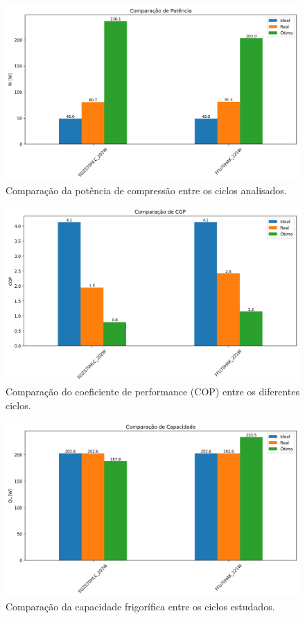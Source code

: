 \begin{figure}[ht]
    \centering
    \includegraphics[width=0.8\linewidth]{Imagens/Desenvolvimento/barras_W.png}
    \caption{Comparação da potência de compressão entre os ciclos analisados.}
    \label{fig:barras W}
\end{figure}

\begin{figure}[ht]
    \centering
    \includegraphics[width=0.8\linewidth]{Imagens/Desenvolvimento/barras_COP.png}
    \caption{Comparação do coeficiente de performance (COP) entre os diferentes ciclos.}
    \label{fig:barras COP}
\end{figure}

\begin{figure}[ht]
    \centering
    \includegraphics[width=0.8\linewidth]{Imagens/Desenvolvimento/barras_QL.png}
    \caption{Comparação da capacidade frigorífica entre os ciclos estudados.}
    \label{fig:barras Ql}
\end{figure}

